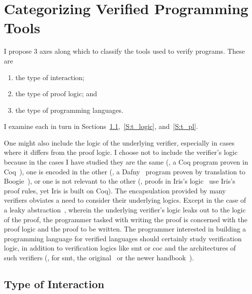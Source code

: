 \section{Categorizing Verified Programming Tools}\label{S:categories}

I propose 3 axes along which to classify the tools used to verify programs.
These are
\begin{enumerate}
    \item the type of interaction;
    \item the type of proof logic; and
    \item the type of programming languages.
\end{enumerate}

I examine each in turn in Sections~\ref{S:t_interaction},~\ref{S:t_logic},
and~\ref{S:t_pl}.

One might also include the logic of the underlying verifier, especially in cases
where it differs from the proof logic. I choose not to include the verifier's
logic because in the cases I have studied they are the same (\eg, a Coq program
proven in Coq~\cite{Coq}), one is encoded in the other (\eg, a
Dafny~\cite{leino2010dafny} program proven by translation to
Boogie~\cite{Barnett_2006,leino2008this}), or one is not relevant to the other
(\eg, proofs in Iris's logic~\cite{Jung_2018b} use Iris's proof rules, yet
Iris is built on Coq). The encapsulation provided by many verifiers obviates a
need to consider their underlying logics. Except in the case of a leaky
abstraction~\cite{Spolsky_2002}, wherein the underlying verifier's logic leaks
out to the logic of the proof, the programmer tasked with writing the proof is
concerned with the proof logic and the proof to be written. The
programmer interested in building a programming language for verified languages
should certainly study verification logic, in addition to verification logics
like \gls{smt} or \gls{coc} and the architectures of such verifiers (\eg, for
\gls{smt}, the original~\cite{Davis_1960,Davis_1962} or the newer
handbook~\cite{biere2009handbook}).

\subsection{Type of Interaction}\label{S:t_interaction}

